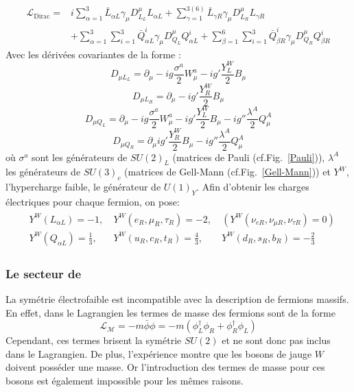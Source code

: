 \begin{equation}
\begin{split}
\mathcal{L}_{\mathrm{Dirac}}=&i\sum_{\alpha=1}^{3}\bar{L}_{\alpha L}\gamma_{\mu}D_{L_{L}}^{\mu}L_{\alpha L}+\sum_{\gamma=1}^{3(6)}\bar{L}_{\gamma R}\gamma_{\mu}D_{L_{R}}^{\mu}L_{\gamma R}\\
&+\sum_{\alpha=1}^{3}\sum_{i=1}^{3}\bar{Q}_{\alpha L}^{i}\gamma_{\mu}D_{Q_{L}}^{\mu}Q_{\alpha L}^{i}+\sum_{\beta=1}^{6}\sum_{i=1}^{3}\bar{Q}_{\beta R}^{i}\gamma_{\mu}D_{Q_{R}}^{\mu}Q_{\beta R}^{i}
\end{split}
\end{equation}
Avec les dérivées covariantes de la forme : 
\begin{equation}
D_{\mu L_{L}}=\partial_{\mu} -ig\frac{\sigma^a}{2}W_{\mu}^{a}-ig'\frac{Y^{W}_{L}}{2}B_{\mu}
\end{equation}
\begin{equation}
D_{\mu L_{R}}=\partial_{\mu} -ig'\frac{Y^{W}_{R}}{2}B_{\mu}
\end{equation}
\begin{equation}
D_{\mu Q_{L}}=\partial_{\mu} -ig\frac{\sigma^a}{2}W_{\mu}^{a}-ig'\frac{Y^{W}_{L}}{2}B_{\mu}-ig''\frac{\lambda^{A}}{2}Q_{\mu}^{A}
\end{equation}
\begin{equation}
D_{\mu Q_{R}}=\partial_{\mu}ig'\frac{Y^{W}_{R}}{2}B_{\mu}-ig''\frac{\lambda^{A}}{2}Q_{\mu}^{A}
\end{equation}
où $\sigma^{a}$ sont les générateurs de $SU(2)_{L}$ (matrices de Pauli (cf.Fig.~\ref{Pauli})), $\lambda^{A}$ les générateurs de $SU(3)_{c}$ (matrices de Gell-Mann (cf.Fig.~\ref{Gell-Mann})) et $Y^{W}$, l'hypercharge faible, le générateur de $U(1)_{Y}$. 
Afin d'obtenir les charges électriques pour chaque fermion, on pose:
\begin{multline}
\begin{split}
&Y^W(L_{\alpha L})=-1,\ &Y^W(e_{R},\mu_{R},\tau_{R})=-2,\ &\left(Y^W(\nu_{e R},\nu_{\mu R},\nu_{\tau R})=0\right)\\
&Y^W(Q_{\alpha L})=\frac{1}{3},\ &Y^W(u_{R},c_{R},t_{R})=\frac{4}{3},\ &Y^W(d_{R},s_{R},b_{R})=-\frac{2}{3}
\end{split}
\end{multline}  


\subsubsection{Le secteur de } 
La symétrie électrofaible est incompatible avec la description de fermions massifs. En effet, dans le Lagrangien les termes de masse des fermions sont de la forme 
\begin{equation}
\mathcal{L_{M}}=-m\bar{\phi}\phi=-m \left(\phi_{L}^{\dagger}\phi_{R}+\phi_{R}^{\dagger}\phi_{L}\right)
\end{equation}
Cependant, ces termes brisent la symétrie $SU(2)$ et ne sont donc pas inclus dans le Lagrangien. De plus, l'expérience montre que les bosons de jauge $W$ doivent posséder une masse. Or l'introduction des termes de masse pour ces bosons est également impossible pour les mêmes raisons.

